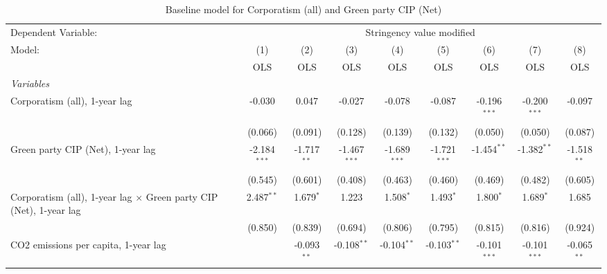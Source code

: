 
\begin{table}[htbp]
   \caption{Baseline model for Corporatism (all) and Green party CIP (Net)}
   \centering
   \begin{tabular}{lcccccccc}
      \toprule
      Dependent Variable: & \multicolumn{8}{c}{Stringency value modified}\\
      Model:                                                                    & (1)            & (2)           & (3)            & (4)            & (5)            & (6)            & (7)            & (8)\\  
                                                                                &  OLS           & OLS           & OLS            & OLS            & OLS            & OLS            & OLS            & OLS\\  
      \midrule
      \emph{Variables}\\
      Corporatism (all), 1-year lag                                             & -0.030         & 0.047         & -0.027         & -0.078         & -0.087         & -0.196$^{***}$ & -0.200$^{***}$ & -0.097\\   
                                                                                & (0.066)        & (0.091)       & (0.128)        & (0.139)        & (0.132)        & (0.050)        & (0.050)        & (0.087)\\   
      Green party CIP (Net), 1-year lag                                         & -2.184$^{***}$ & -1.717$^{**}$ & -1.467$^{***}$ & -1.689$^{***}$ & -1.721$^{***}$ & -1.454$^{**}$  & -1.382$^{**}$  & -1.518$^{**}$\\   
                                                                                & (0.545)        & (0.601)       & (0.408)        & (0.463)        & (0.460)        & (0.469)        & (0.482)        & (0.605)\\   
      Corporatism (all), 1-year lag $\times$ Green party CIP (Net), 1-year lag  & 2.487$^{**}$   & 1.679$^{*}$   & 1.223          & 1.508$^{*}$    & 1.493$^{*}$    & 1.800$^{*}$    & 1.689$^{*}$    & 1.685\\   
                                                                                & (0.850)        & (0.839)       & (0.694)        & (0.806)        & (0.795)        & (0.815)        & (0.816)        & (0.924)\\   
      CO2 emissions per capita, 1-year lag                                      &                & -0.093$^{**}$ & -0.108$^{**}$  & -0.104$^{**}$  & -0.103$^{**}$  & -0.101$^{***}$ & -0.101$^{***}$ & -0.065$^{**}$\\   

\end{tabular}
\end{table}
